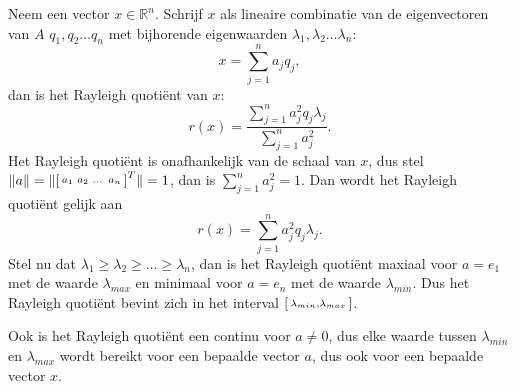 Neem een vector $x \in \mathbb{R}^n$. Schrijf $x$ als lineaire combinatie van de eigenvectoren van $A$ $q_1, q_2 \dots q_n$ met bijhorende eigenwaarden $\lambda_1, \lambda_2 \dots \lambda_n$:
$$ x = \sum_{j=1}^{n}a_jq_j,$$
dan is het Rayleigh quoti\"ent van $x$:
$$r(x) = \frac{\sum_{j=1}^{n}a_j^2q_j\lambda_j}{\sum_{j=1}^{n}a_j^2}.$$
Het Rayleigh quoti\"ent is onafhankelijk van de schaal van $x$, dus stel $\lVert a \rVert = \lVert \begin{bsmallmatrix} a_1&a_2&\dots&a_n\end{bsmallmatrix}^T \rVert = 1$, dan is $\sum_{j=1}^{n}a_j^2 = 1$. Dan wordt het Rayleigh quoti\"ent gelijk aan
$$r(x) = \sum_{j=1}^{n}a_j^2q_j\lambda_j.$$
Stel nu dat $\lambda_1 \geq \lambda_2 \geq \dots \geq \lambda_n$, dan is het Rayleigh quoti\"ent maxiaal voor $a = e_1$ met de waarde $\lambda_{max}$ en minimaal voor $a = e_n$ met de waarde $\lambda_{min}$. Dus het Rayleigh quoti\"ent bevint zich in het interval $\begin{bsmallmatrix}\lambda_{min},\lambda_{max}\end{bsmallmatrix}$.

Ook is het Rayleigh quoti\"ent een continu voor $a \neq 0$, dus elke waarde tussen $\lambda_{min}$ en $\lambda_{max}$ wordt bereikt voor een bepaalde vector $a$, dus ook voor een bepaalde vector $x$.